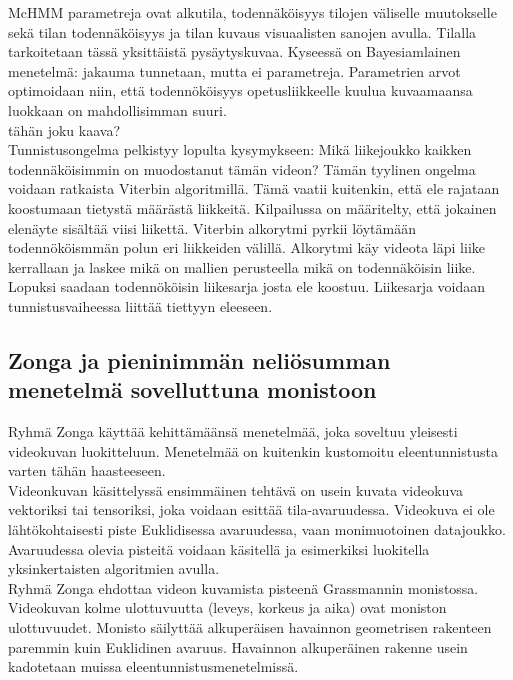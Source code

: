 McHMM parametreja ovat alkutila, todennäköisyys tilojen väliselle muutokselle sekä tilan todennäköisyys ja tilan kuvaus visuaalisten sanojen avulla. 
Tilalla tarkoitetaan tässä yksittäistä pysäytyskuvaa. Kyseessä on Bayesiamlainen menetelmä: jakauma tunnetaan, mutta ei parametreja.
Parametrien arvot optimoidaan niin, että todennököisyys opetusliikkeelle kuulua kuvaamaansa luokkaan on mahdollisimman suuri.\\
tähän joku kaava? \\

Tunnistusongelma pelkistyy lopulta kysymykseen: Mikä liikejoukko kaikken todennäköisimmin on muodostanut tämän videon?
Tämän tyylinen ongelma voidaan ratkaista Viterbin algoritmillä. Tämä vaatii kuitenkin, että ele rajataan koostumaan tietystä määrästä liikkeitä.
Kilpailussa on määritelty, että jokainen elenäyte sisältää viisi liikettä.
Viterbin alkorytmi pyrkii löytämään todennököismmän polun eri liikkeiden välillä. Alkorytmi käy videota läpi liike kerrallaan ja laskee mikä
on mallien perusteella mikä on todennäköisin liike. Lopuksi saadaan todennököisin liikesarja josta ele koostuu.
Liikesarja voidaan tunnistusvaiheessa liittää tiettyyn eleeseen. \citep {6239185}\\ 


\subsection{Zonga ja pieninimmän neliösumman menetelmä sovelluttuna monistoon}
Ryhmä Zonga käyttää kehittämäänsä menetelmää, joka soveltuu yleisesti videokuvan luokitteluun. 
Menetelmää on kuitenkin kustomoitu eleentunnistusta varten tähän haasteeseen.\\

Videonkuvan käsittelyssä ensimmäinen tehtävä on usein kuvata videokuva vektoriksi tai tensoriksi, joka voidaan esittää tila-avaruudessa. 
Videokuva ei ole lähtökohtaisesti piste Euklidisessa avaruudessa, vaan monimuotoinen datajoukko. Avaruudessa olevia pisteitä voidaan käsitellä
ja esimerkiksi luokitella yksinkertaisten algoritmien avulla.\\

Ryhmä Zonga ehdottaa videon kuvamista pisteenä Grassmannin monistossa. Videokuvan kolme ulottuvuutta (leveys, korkeus ja aika) ovat moniston ulottuvuudet.
Monisto säilyttää alkuperäisen havainnon geometrisen rakenteen paremmin kuin Euklidinen avaruus.
Havainnon alkuperäinen rakenne usein kadotetaan muissa eleentunnistusmenetelmissä. \\


